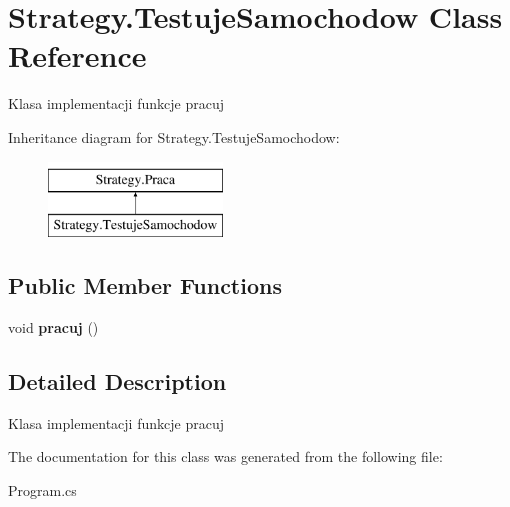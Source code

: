 \hypertarget{class_strategy_1_1_testuje_samochodow}{}\section{Strategy.\+Testuje\+Samochodow Class Reference}
\label{class_strategy_1_1_testuje_samochodow}


Klasa implementacji funkcje pracuj  


Inheritance diagram for Strategy.\+Testuje\+Samochodow\+:\begin{figure}[H]
\begin{center}
\leavevmode
\includegraphics[height=2.000000cm]{class_strategy_1_1_testuje_samochodow}
\end{center}
\end{figure}
\subsection*{Public Member Functions}
\begin{DoxyCompactItemize}
\item 
\mbox{\label{class_strategy_1_1_testuje_samochodow_a1ebd8f6a3af21e92198e871cc1610f16}} 
void {\bfseries pracuj} ()
\end{DoxyCompactItemize}


\subsection{Detailed Description}
Klasa implementacji funkcje pracuj 



The documentation for this class was generated from the following file\+:\begin{DoxyCompactItemize}
\item 
Program.\+cs\end{DoxyCompactItemize}
